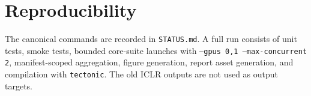 \section{Reproducibility}


The canonical commands are recorded in \texttt{STATUS.md}. A full run consists of unit tests, smoke tests, bounded core-suite launches with \texttt{--gpus 0,1 --max-concurrent 2}, manifest-scoped aggregation, figure generation, report asset generation, and compilation with \texttt{tectonic}. The old ICLR outputs are not used as output targets.
